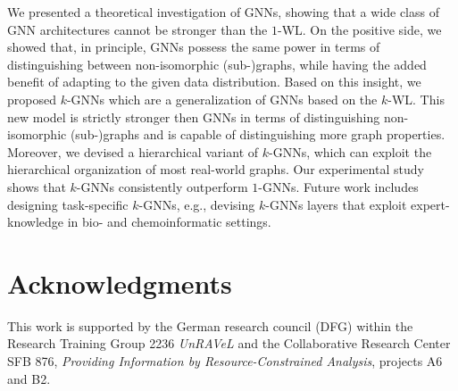 \documentclass[letterpaper]{article}
\theoremstyle{definition}
\begin{document}
We presented a theoretical investigation of GNNs, showing that a wide class of GNN architectures cannot be stronger than the $1$-WL. On the positive side, we showed that, in principle, GNNs possess the same power in terms of distinguishing between non-isomorphic (sub-)graphs, while having the added benefit of adapting to the given data distribution. Based on this insight, we proposed $k$-GNNs which are a generalization of GNNs based on the $k$-WL. This new model is strictly stronger then GNNs in terms of distinguishing non-isomorphic (sub-)graphs and is capable of distinguishing more graph properties. Moreover, we devised a hierarchical variant of $k$-GNNs, which can exploit the hierarchical organization of most real-world graphs. Our experimental study shows that $k$-GNNs consistently outperform $1$-GNNs. Future work includes designing task-specific $k$-GNNs, e.g., devising $k$-GNNs layers that exploit expert-knowledge in bio- and chemoinformatic settings. 

\section*{Acknowledgments}
This work is supported by the German research council (DFG) within the Research Training Group 2236 \emph{UnRAVeL} and the Collaborative Research Center
SFB 876, \emph{Providing Information by Resource-Constrained
	Analysis}, projects A6 and B2.
\end{document}

